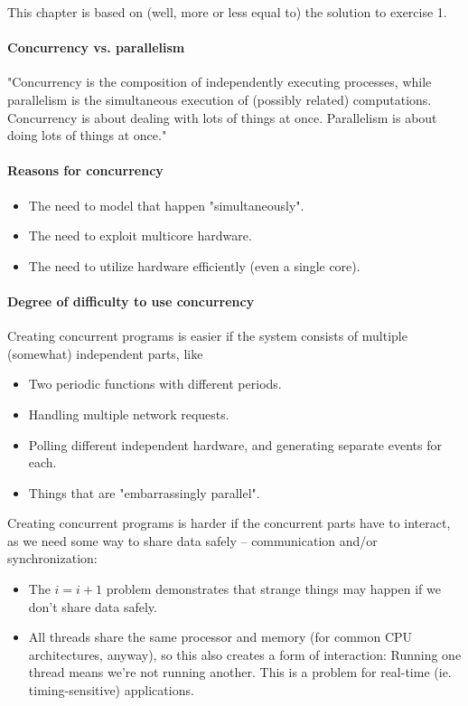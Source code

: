 
This chapter is based on (well, more or less equal to) the solution to exercise 1.

\sepline

\paragraph{Concurrency vs. parallelism} "Concurrency is the composition of independently executing processes, while parallelism is the simultaneous execution of (possibly related) computations. Concurrency is about dealing with lots of things at once. Parallelism is about doing lots of things at once."

\paragraph{Reasons for concurrency}
\begin{itemize}[nolistsep,noitemsep]
	\item The need to model that happen "simultaneously".
	\item The need to exploit multicore hardware.
	\item The need to utilize hardware efficiently (even a single core).
\end{itemize}

\paragraph{Degree of difficulty to use concurrency}
Creating concurrent programs is easier if the system consists of multiple (somewhat) independent parts, like
\begin{itemize}[nolistsep,noitemsep]
	\item Two periodic functions with different periods.
	\item Handling multiple network requests.
	\item Polling different independent hardware, and generating separate events for each.
	\item Things that are "embarrassingly parallel".
\end{itemize}

Creating concurrent programs is harder if the concurrent parts have to interact, as we need some way to share data safely -- communication and/or synchronization:
\begin{itemize}
	\item The $i=i+1$ problem demonstrates that strange things may happen if we don't share data safely.
	\item All threads share the same processor and memory (for common CPU architectures, anyway), so this also creates a form of interaction: Running one thread means we're not running another. This is a problem for real-time (ie. timing-sensitive) applications.
\end{itemize}

